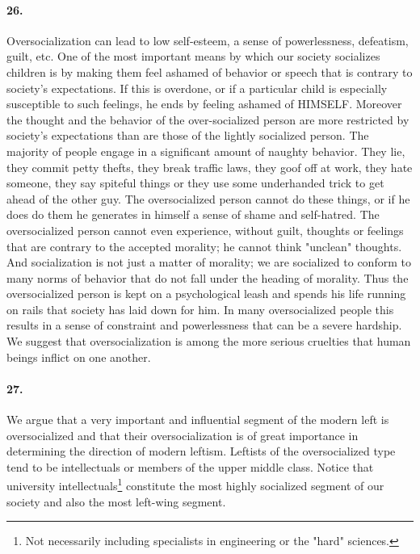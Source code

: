 \documentclass[12pt]{book}
\begin{document}
\paragraph{26.} Oversocialization can lead to low self-esteem, a sense of powerlessness, defeatism, guilt, etc. One of the most important means by which our society socializes children is by making them feel ashamed of behavior or speech that is contrary to society's expectations. If this is overdone, or if a particular child is especially susceptible to such feelings, he ends by feeling ashamed of HIMSELF. Moreover the thought and the behavior of the over-socialized person are more restricted by society's expectations than are those of the lightly socialized person. The majority of people engage in a significant amount of naughty behavior. They lie, they commit petty thefts, they break traffic laws, they goof off at work, they hate someone, they say spiteful things or they use some underhanded trick to get ahead of the other guy. The oversocialized person cannot do these things, or if he does do them he generates in himself a sense of shame and self-hatred.  The oversocialized person cannot even experience, without guilt, thoughts or feelings that are contrary to the accepted morality; he cannot think "unclean" thoughts. And socialization is not just a matter of morality; we are socialized to conform to many norms of behavior that do not fall under the heading of morality. Thus the oversocialized person is kept on a psychological leash and spends his life running on rails that society has laid down for him. In many oversocialized people this results in a sense of constraint and powerlessness that can be a severe hardship. We suggest that oversocialization is among the more serious cruelties that human beings inflict on one another.


\paragraph{27.} We argue that a very important and influential segment of the modern left is oversocialized and that their oversocialization is of great importance in determining the direction of modern leftism. Leftists of the oversocialized type tend to be intellectuals or members of the upper middle class. Notice that university intellectuals\footnote{Not necessarily including specialists in engineering or the "hard" sciences.} constitute the most highly socialized segment of our society and also the most left-wing segment.
\end{document}
